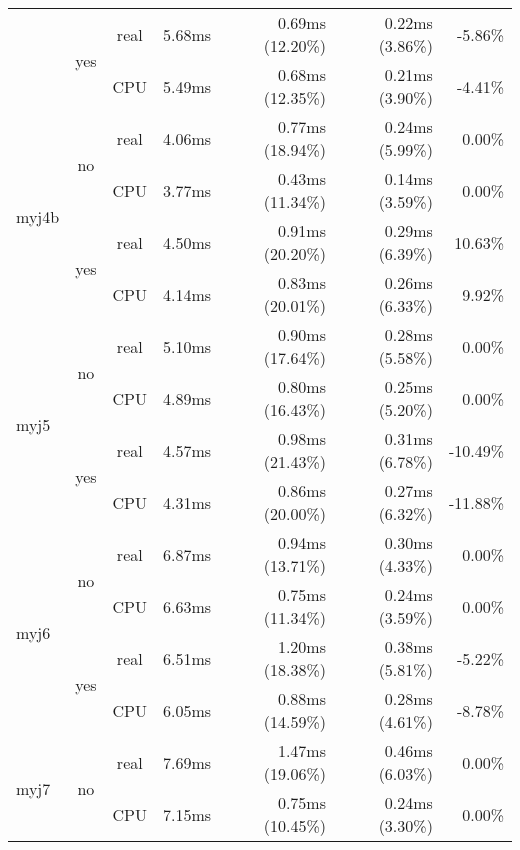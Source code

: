 \documentclass[en]{pracamgr}
\begin{document}
\begin{appendices}
\begin{small}
\begin{longtable}{|l|c|c|r|r|r|r|}
                          \cline{2-7}
                          & \multirow{2}{*}{yes} & real & 5.68ms & 0.69ms (12.20\%) & 0.22ms (3.86\%) & -5.86\% \\*
                          &                      & CPU  & 5.49ms & 0.68ms (12.35\%) & 0.21ms (3.90\%) & -4.41\% \\
\hline
\multirow{4}{*}{myj4b}    & \multirow{2}{*}{no}  & real & 4.06ms & 0.77ms (18.94\%) & 0.24ms (5.99\%) & 0.00\% \\*
                          &                      & CPU  & 3.77ms & 0.43ms (11.34\%) & 0.14ms (3.59\%) & 0.00\% \\*
                          \cline{2-7}
                          & \multirow{2}{*}{yes} & real & 4.50ms & 0.91ms (20.20\%) & 0.29ms (6.39\%) & 10.63\% \\*
                          &                      & CPU  & 4.14ms & 0.83ms (20.01\%) & 0.26ms (6.33\%) & 9.92\% \\
\hline
\multirow{4}{*}{myj5}     & \multirow{2}{*}{no}  & real & 5.10ms & 0.90ms (17.64\%) & 0.28ms (5.58\%) & 0.00\% \\*
                          &                      & CPU  & 4.89ms & 0.80ms (16.43\%) & 0.25ms (5.20\%) & 0.00\% \\*
                          \cline{2-7}
                          & \multirow{2}{*}{yes} & real & 4.57ms & 0.98ms (21.43\%) & 0.31ms (6.78\%) & -10.49\% \\*
                          &                      & CPU  & 4.31ms & 0.86ms (20.00\%) & 0.27ms (6.32\%) & -11.88\% \\
\hline
\multirow{4}{*}{myj6}     & \multirow{2}{*}{no}  & real & 6.87ms & 0.94ms (13.71\%) & 0.30ms (4.33\%) & 0.00\% \\*
                          &                      & CPU  & 6.63ms & 0.75ms (11.34\%) & 0.24ms (3.59\%) & 0.00\% \\*
                          \cline{2-7}
                          & \multirow{2}{*}{yes} & real & 6.51ms & 1.20ms (18.38\%) & 0.38ms (5.81\%) & -5.22\% \\*
                          &                      & CPU  & 6.05ms & 0.88ms (14.59\%) & 0.28ms (4.61\%) & -8.78\% \\
\hline
\multirow{4}{*}{myj7}     & \multirow{2}{*}{no}  & real & 7.69ms & 1.47ms (19.06\%) & 0.46ms (6.03\%) & 0.00\% \\*
                          &                      & CPU  & 7.15ms & 0.75ms (10.45\%) & 0.24ms (3.30\%) & 0.00\% \\*

\end{longtable}
\end{small}
\end{appendices}
\end{document}
